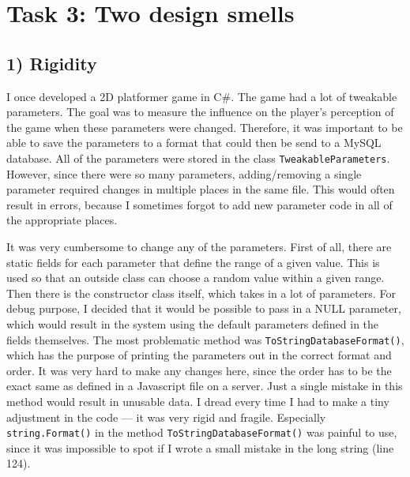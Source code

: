 \section*{Task 3: Two design smells}
\subsection*{1) Rigidity}
I once developed a 2D platformer game in C\#. The game had a lot of tweakable parameters. The goal was to measure the influence on the player's perception of the game when these parameters were changed. Therefore, it was important to be able to save the parameters to a format that could then be send to a MySQL database. All of the parameters were stored in the class \texttt{TweakableParameters}. However, since there were so many parameters, adding/removing a single parameter required changes in multiple places in the same file. This would often result in errors, because I sometimes forgot to add new parameter code in all of the appropriate places.

It was very cumbersome to change any of the parameters. First of all, there are static fields for each parameter that define the range of a given value. This is used so that an outside class can choose a random value within a given range. Then there is the constructor class itself, which takes in a lot of parameters. For debug purpose, I decided that it would be possible to pass in a NULL parameter, which would result in the system using the default parameters defined in the fields themselves. The most problematic method was \texttt{ToStringDatabaseFormat()}, which has the purpose of printing the parameters out in the correct format and order. It was very hard to make any changes here, since the order has to be the exact same as defined in a Javascript file on a server. Just a single mistake in this method would result in unusable data. I dread every time I had to make a tiny adjustment in the code --- it was very rigid and fragile. Especially \texttt{string.Format()} in the method \texttt{ToStringDatabaseFormat()} was painful to use, since it was impossible to spot if I wrote a small mistake in the long string (line 124).

